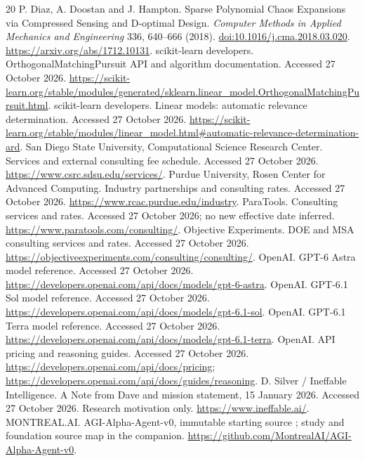 \documentclass[11pt,letterpaper]{article}
\begin{document}
\clearpage
\begin{thebibliography}{20}
\small
{} P. Diaz, A. Doostan and J. Hampton. Sparse Polynomial Chaos Expansions via Compressed Sensing and D-optimal Design. \emph{Computer Methods in Applied Mechanics and Engineering} 336, 640--666 (2018). \href{https://doi.org/10.1016/j.cma.2018.03.020}{doi:10.1016/j.cma.2018.03.020}. \url{https://arxiv.org/abs/1712.10131}.
 scikit-learn developers. OrthogonalMatchingPursuit API and algorithm documentation. Accessed 27 October 2026. \url{https://scikit-learn.org/stable/modules/generated/sklearn.linear_model.OrthogonalMatchingPursuit.html}.
 scikit-learn developers. Linear models: automatic relevance determination. Accessed 27 October 2026. \url{https://scikit-learn.org/stable/modules/linear_model.html#automatic-relevance-determination-ard}.
 San Diego State University, Computational Science Research Center. Services and external consulting fee schedule. Accessed 27 October 2026. \url{https://www.csrc.sdsu.edu/services/}.
 Purdue University, Rosen Center for Advanced Computing. Industry partnerships and consulting rates. Accessed 27 October 2026. \url{https://www.rcac.purdue.edu/industry}.
 ParaTools. Consulting services and rates. Accessed 27 October 2026; no new effective date inferred. \url{https://www.paratools.com/consulting/}.
 Objective Experiments. DOE and MSA consulting services and rates. Accessed 27 October 2026. \url{https://objectiveexperiments.com/consulting/consulting/}.
 OpenAI. GPT-6 Astra model reference. Accessed 27 October 2026. \url{https://developers.openai.com/api/docs/models/gpt-6-astra}.
 OpenAI. GPT-6.1 Sol model reference. Accessed 27 October 2026. \url{https://developers.openai.com/api/docs/models/gpt-6.1-sol}.
 OpenAI. GPT-6.1 Terra model reference. Accessed 27 October 2026. \url{https://developers.openai.com/api/docs/models/gpt-6.1-terra}.
 OpenAI. API pricing and reasoning guides. Accessed 27 October 2026. \url{https://developers.openai.com/api/docs/pricing}; \url{https://developers.openai.com/api/docs/guides/reasoning}.
 D. Silver / Ineffable Intelligence. A Note from Dave and mission statement, 15 January 2026. Accessed 27 October 2026. Research motivation only. \url{https://www.ineffable.ai/}.
 MONTREAL.AI. AGI-Alpha-Agent-v0, immutable starting source ; study and foundation source map in the companion. \url{https://github.com/MontrealAI/AGI-Alpha-Agent-v0}.
\end{thebibliography}
\end{document}

